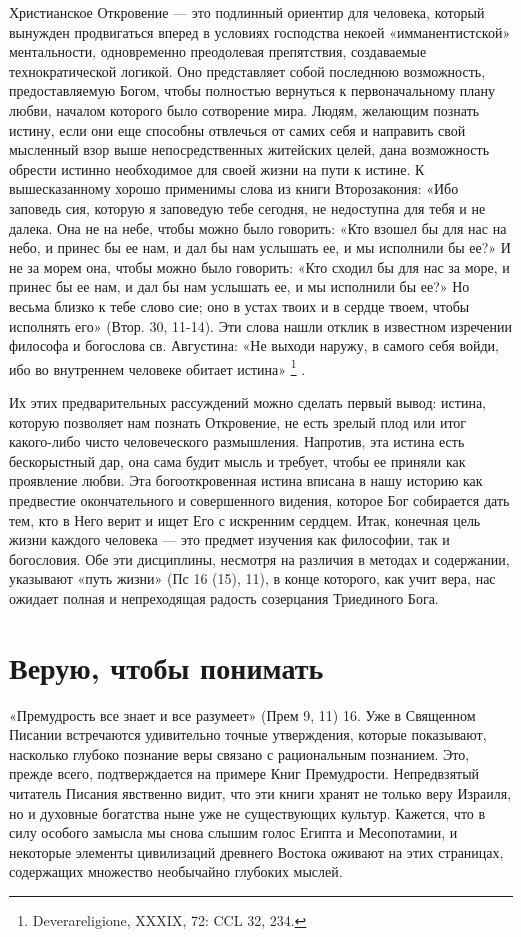 \documentclass[a5paper,10pt]{article}
\begin{document}
Христианское Откровение — это подлинный ориентир для человека, который вынужден
продвигаться вперед в условиях господства некоей «имманентистской»
ментальности, одновременно преодолевая препятствия, создаваемые
технократической логикой. Оно представляет собой последнюю возможность,
предоставляемую Богом, чтобы полностью вернуться к первоначальному плану любви,
началом которого было сотворение мира. Людям, желающим познать истину, если они
еще способны отвлечься от самих себя и направить свой мысленный взор выше
непосредственных житейских целей, дана возможность обрести истинно необходимое
для своей жизни на пути к истине. К вышесказанному хорошо применимы слова из
книги Второзакония: «Ибо заповедь сия, которую я заповедую тебе сегодня, не
недоступна для тебя и не далека. Она не на небе, чтобы можно было говорить:
«Кто взошел бы для нас на небо, и принес бы ее нам, и дал бы нам услышать ее, и
мы исполнили бы ее?» И не за морем она, чтобы можно было говорить: «Кто сходил
бы для нас за море, и принес бы ее нам, и дал бы нам услышать ее, и мы
исполнили бы ее?» Но весьма близко к тебе слово сие; оно в устах твоих и в
сердце твоем, чтобы исполнять его» (Втор. 30, 11-14). Эти слова нашли отклик в
известном изречении философа и богослова св. Августина: «Не выходи наружу, в
самого себя войди, ибо во внутреннем человеке обитает истина»
\footnote{Deverareligione, XXXIX, 72: CCL 32, 234.} .

Их этих предварительных рассуждений можно сделать первый вывод: истина, которую
позволяет нам познать Откровение, не есть зрелый плод или итог какого-либо
чисто человеческого размышления. Напротив, эта истина есть бескорыстный дар,
она сама будит мысль и требует, чтобы ее приняли как проявление любви. Эта
богооткровенная истина вписана в нашу историю как предвестие окончательного и
совершенного видения, которое Бог собирается дать тем, кто в Него верит и ищет
Его с искренним сердцем. Итак, конечная цель жизни каждого человека — это
предмет изучения как философии, так и богословия. Обе эти дисциплины, несмотря
на различия в методах и содержании, указывают «путь жизни» (Пс 16 (15), 11), в
конце которого, как учит вера, нас ожидает полная и непреходящая радость
созерцания Триединого Бога.

\section{Верую, чтобы понимать}

«Премудрость все знает и все разумеет» (Прем 9, 11) 16. Уже в Священном Писании
встречаются удивительно точные утверждения, которые показывают, насколько
глубоко познание веры связано с рациональным познанием. Это, прежде всего,
подтверждается на примере Книг Премудрости. Непредвзятый читатель Писания
явственно видит, что эти книги хранят не только веру Израиля, но и духовные
богатства ныне уже не существующих культур. Кажется, что в силу особого замысла
мы снова слышим голос Египта и Месопотамии, и некоторые элементы цивилизаций
древнего Востока оживают на этих страницах, содержащих множество необычайно
глубоких мыслей.
\end{document}
